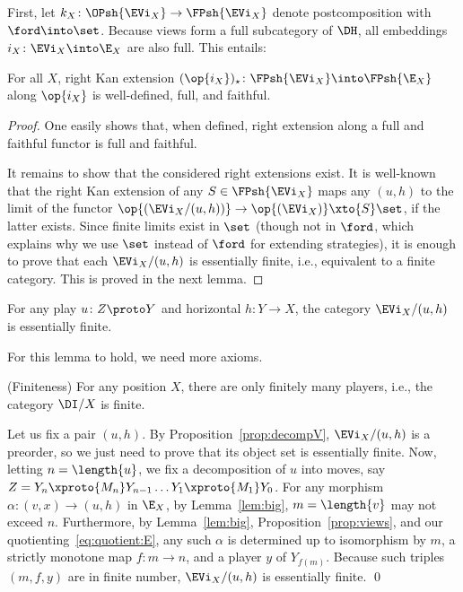 \documentclass{LMCS}
\theoremstyle{plain}\newtheorem{satz}[thm]{Satz}
\begin{document}
First, let $k_X \colon \OPsh{\EVi_X} \to \FPsh{\EVi_X}$ denote
postcomposition with $\ford \into \set$.  Because views form a full
subcategory of $\DH$, all embeddings $i_X \colon \EVi_X \into \E_X$
are also full.  This entails:
\begin{lem}\label{lem:kanff}
  For all $X$, right Kan extension $(\op{i_X})_\star \colon \FPsh{\EVi_X}
  \into \FPsh{\E_X}$ along $\op {i_X}$ is well-defined, full, and faithful.
\end{lem}

\begin{proof}
  One easily shows that, when defined, right extension along a full
  and faithful functor is full and faithful. 

  It remains to show that the considered right extensions exist.  It
  is well-known~\citep{MacLane:cwm} that the right Kan extension of
  any $S \in \FPsh{\EVi_X}$ maps any $(u,h)$ to the limit of the
  functor $\op{(\EVi_X / (u,h))} \to \op{(\EVi_X)} \xto{S} \set$, if
  the latter exists.  Since finite limits exist in $\set$ (though not
  in $\ford$, which explains why we use $\set$ instead of $\ford$ for
  extending strategies), it is enough to prove that each $\EVi_X /
  (u,h)$ is essentially finite, i.e., equivalent to a finite
  category. This is proved in the next lemma.
\end{proof}

\begin{lem}\label{lem:kanexists}
  For any play $u \colon Z \proto Y$ and horizontal $h \colon Y \to X$, the category $\EVi_X / (u,h)$ is
  essentially finite.
\end{lem}

For this lemma to hold, we need more axioms.
\begin{ax}
  \begin{axioms}
  \item (Finiteness) For any position $X$, there are only finitely
    many players, i.e., the category $\DI / X$ is finite. \label{finiteness}
\end{axioms}
\end{ax}


 Let us fix a pair $(u,h)$. By
Proposition~\ref{prop:decompV}, $\EVi_X / (u,h)$ is a preorder, so we just
need to prove that its object set is essentially finite.  Now, letting
$n = \length{u}$, we fix a decomposition of $u$ into moves, say $Z = Y_n \xproto{M_n} Y_{n-1}
\ldots Y_1 \xproto{M_1} Y_0$. For any morphism $\alpha \colon (v,x) \to (u,h)$ in
$\E_X$, by Lemma~\ref{lem:big}, $m = \length{v}$ may not exceed $n$.  Furthermore, by
Lemma~\ref{lem:big}, Proposition~\ref{prop:views}, and our
quotienting~\eqref{eq:quotient:E}, any such $\alpha$ is determined up
to isomorphism by $m$, a strictly monotone map $f \colon m \to n$, and
a player $y$ of $Y_{f(m)}$. Because such triples $(m,f,y)$ are in finite number,
$\EVi_X / (u,h)$ is essentially finite. \qed
\end{document}

